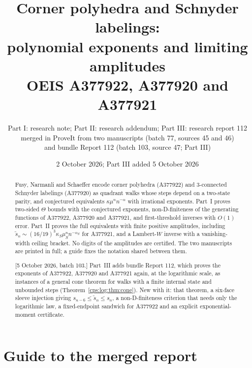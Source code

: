 \documentclass[11pt,letterpaper]{article}
\title{Corner polyhedra and Schnyder labelings:\\polynomial exponents and limiting amplitudes\\[4pt]
\large OEIS A377922, A377920 and A377921}
\author{Part I: research note; Part II: research addendum; Part III: research report 112\\[2pt]\small merged in ProveIt from two manuscripts (batch 77, sources 45 and 46)\\
\small and bundle Report 112 (batch 103, source 47; Part III)}
\date{2 October 2026; Part III added 5 October 2026}
\numberwithin{equation}{section}
\theoremstyle{remark}\newtheorem{remark}[theorem]{Remark}
\begin{document}
\maketitle
\begin{abstract}
Fusy, Narmanli and Schaeffer encode corner polyhedra (A377922) and 3-connected Schnyder
labelings (A377920) as quadrant walks whose steps depend on a two-state parity, and conjectured
equivalents $\kappa\mu^nn^{-\alpha}$ with irrational exponents. Part~I proves two-sided
$\Theta$ bounds with the conjectured exponents, non-D-finiteness of the generating functions of
A377922, A377920 and A377921, and first-threshold inverses with $O(1)$ error. Part~II proves the
full equivalents with finite positive amplitudes, including
$\widetilde s_n\sim(16/19)^3\kappa_S\mu_S^nn^{-\alpha_S}$ for A377921, and a Lambert-$W$ inverse
with a vanishing-width ceiling bracket. No digits of the amplitudes are certified. The two
manuscripts are printed in full; a guide fixes the notation shared between them.

[5 October 2026, batch 103.] Part~III adds bundle Report 112, which proves the exponents of
A377922, A377920 and A377921 again, at the logarithmic scale, as instances of a general cone
theorem for walks with a finite internal state and unbounded steps (Theorem~\ref{cps:log:thm:cone}).
New with it: that theorem, a six-face sleeve injection giving $s_{n-6}\le\widetilde s_n\le s_n$, a
non-D-finiteness criterion that needs only the logarithmic law, a fixed-endpoint sandwich for
A377922 and an explicit exponential-moment certificate.
\end{abstract}
\tableofcontents
\clearpage
\begingroup\sloppy
\section*{Guide to the merged report}\label{cps:sec:guide}
\end{document}
